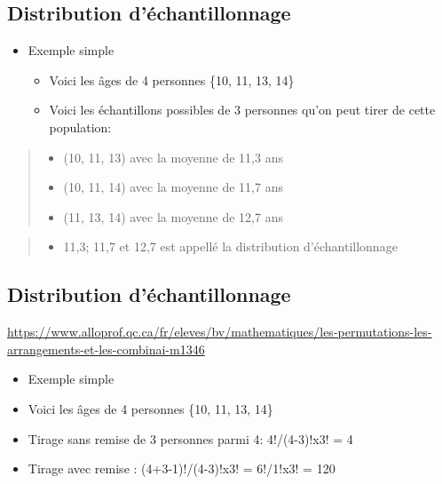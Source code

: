 \documentclass[
]{article}
\providecommand{\tightlist}{%
  \setlength{\itemsep}{0pt}\setlength{\parskip}{0pt}}
\begin{document}
\hypertarget{distribution-duxe9chantillonnage-2}{%
\subsection{Distribution
d'échantillonnage}\label{distribution-duxe9chantillonnage-2}}

\begin{itemize}
\item
  Exemple simple

  \begin{itemize}
  \tightlist
  \item
    Voici les âges de 4 personnes \{10, 11, 13, 14\}
  \item
    Voici les échantillons possibles de 3 personnes qu'on peut tirer de
    cette population:
  \end{itemize}
\end{itemize}

\begin{quote}
\begin{itemize}
\tightlist
\item
  (10, 11, 13) avec la moyenne de 11,3 ans
\item
  (10, 11, 14) avec la moyenne de 11,7 ans
\item
  (11, 13, 14) avec la moyenne de 12,7 ans
\end{itemize}
\end{quote}

\begin{quote}
\begin{itemize}
\tightlist
\item
  11,3; 11,7 et 12,7 est appellé la distribution d'échantillonnage
\end{itemize}
\end{quote}

\hypertarget{distribution-duxe9chantillonnage-3}{%
\subsection{Distribution
d'échantillonnage}\label{distribution-duxe9chantillonnage-3}}

\url{https://www.alloprof.qc.ca/fr/eleves/bv/mathematiques/les-permutations-les-arrangements-et-les-combinai-m1346}

\begin{itemize}
\item
  Exemple simple
\item
  Voici les âges de 4 personnes \{10, 11, 13, 14\}
\item
  Tirage sans remise de 3 personnes parmi 4: 4!/(4-3)!x3! = 4
\item
  Tirage avec remise : (4+3-1)!/(4-3)!x3! = 6!/1!x3! = 120
\end{itemize}
\end{document}
